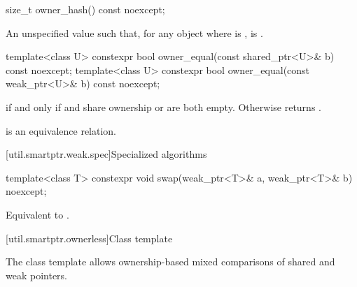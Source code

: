 %
\begin{itemdecl}
size_t owner_hash() const noexcept;
\end{itemdecl}

\begin{itemdescr}
\pnum
\returns
An unspecified value such that,
for any object  where  is ,
 is .
\end{itemdescr}

%
\begin{itemdecl}
template<class U>
  constexpr bool owner_equal(const shared_ptr<U>& b) const noexcept;
template<class U>
  constexpr bool owner_equal(const weak_ptr<U>& b) const noexcept;
\end{itemdecl}

\begin{itemdescr}
\pnum
\returns
{} if and only if
 and  share ownership or are both empty.
Otherwise returns .

\pnum
\remarks
{} is an equivalence relation.
\end{itemdescr}

[util.smartptr.weak.spec]{Specialized algorithms}

%
\begin{itemdecl}
template<class T>
  constexpr void swap(weak_ptr<T>& a, weak_ptr<T>& b) noexcept;
\end{itemdecl}

\begin{itemdescr}
\pnum
\effects
Equivalent to .
\end{itemdescr}

[util.smartptr.ownerless]{Class template }

\pnum
The class template  allows ownership-based mixed comparisons of shared
and weak pointers.

